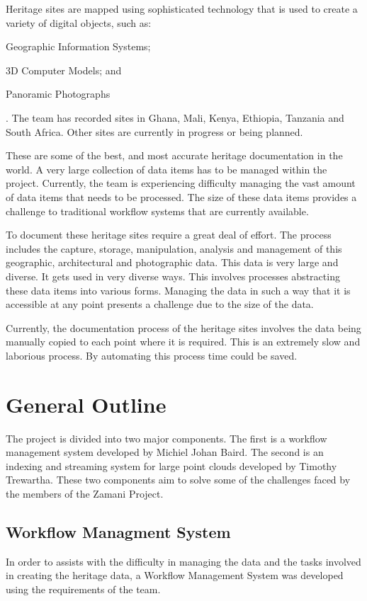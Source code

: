     Heritage sites are mapped using sophisticated technology that is
    used to create a variety of digital objects, such as:
    \begin{inparaenum}[i)] \item Geographic Information Systems; \item 3D
    Computer Models; and \item Panoramic Photographs\end{inparaenum}.
    The team has recorded sites in Ghana, Mali, Kenya, Ethiopia, Tanzania and
    South Africa. Other sites are currently in progress or being planned.

    These are some of the best, and most accurate heritage documentation
    in the world.
    A very large collection of data items has to be managed
    within the project. Currently, the team is experiencing difficulty managing
    the vast amount of data items that needs to be processed. The size of these
    data items provides a challenge to traditional workflow systems that are
    currently available.

    To document these heritage sites require a great deal of effort. The process includes
    the capture, storage, manipulation, analysis and management of this geographic,
    architectural and photographic data. This data is very large and diverse. It gets
    used in very diverse ways. This involves processes abstracting these data
    items into various forms. Managing the data in such a way that it is accessible
    at any point presents a challenge due to the size of the data.

    Currently, the documentation process of the heritage sites involves the data being
    manually copied to each point where it is required. This is an extremely slow and
    laborious process. By automating this process time could be saved.



\section{General Outline}
    The project is divided into two major components. The first is a
    workflow management system developed by Michiel Johan Baird. The
    second is an indexing and streaming system for large point clouds
    developed by Timothy Trewartha. These two components aim to solve some
    of the challenges faced by the members of the Zamani Project.
    \subsection{Workflow Managment System}
        In order to assists with the difficulty in managing the data and the tasks involved
        in creating the heritage data, a Workflow Management System was developed using
        the requirements of the team.

